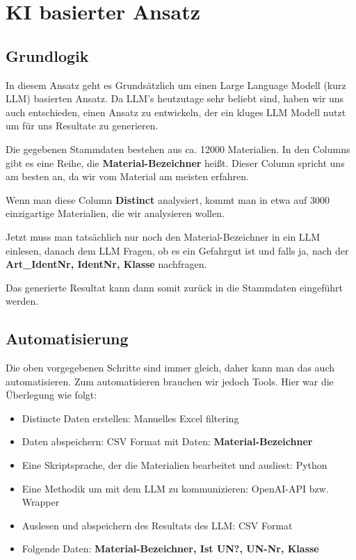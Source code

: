 \section{KI basierter Ansatz}
\subsection{Grundlogik}

In diesem Ansatz geht es Grundsätzlich um einen
Large Language Modell (kurz LLM) basierten Ansatz.
Da LLM's heutzutage sehr beliebt sind, haben wir uns auch entschieden,
einen Ansatz zu entwickeln, der ein kluges LLM Modell nutzt um für uns
Resultate zu generieren.

Die gegebenen Stammdaten bestehen aus ca. 12000 Materialien.
In den Columns gibt es eine Reihe, die \textbf{Material-Bezeichner} heißt.
Dieser Column spricht uns am besten an, da wir vom Material am meisten erfahren.

Wenn man diese Column \textbf{Distinct} analysiert, kommt man in etwa auf
3000 einzigartige Materialien, die wir analysieren wollen.

Jetzt muss man tatsächlich nur noch den Material-Bezeichner in ein LLM einlesen,
danach dem LLM Fragen, ob es ein Gefahrgut ist und falls ja, nach der
\textbf{Art\_IdentNr, IdentNr, Klasse} nachfragen.

Das generierte Resultat kann dann somit zurück in die Stammdaten eingeführt werden.

\subsection{Automatisierung}

Die oben vorgegebenen Schritte sind immer gleich, daher kann man das auch automatisieren.
Zum automatisieren brauchen wir jedoch Tools. Hier war die Überlegung wie folgt:
\begin{itemize}
    \item Distincte Daten erstellen: Manuelles Excel filtering
    \item Daten abspeichern: CSV Format mit Daten: \textbf{Material-Bezeichner}
    \item Eine Skriptsprache, der die Materialien bearbeitet und ausliest: Python
    \item Eine Methodik um mit dem LLM zu kommunizieren: OpenAI-API bzw. Wrapper
    \item Auslesen und abspeichern des Resultats des LLM: CSV Format
    \item Folgende Daten: \textbf{Material-Bezeichner, Ist UN?, UN-Nr, Klasse}
\end{itemize}

